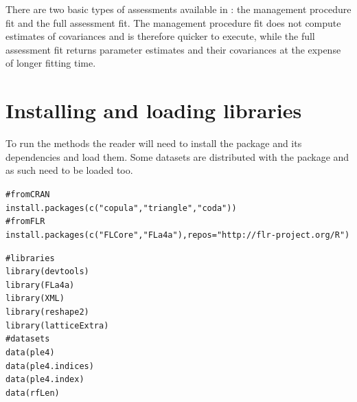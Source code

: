\documentclass[a4paper,english,10pt]{article}\usepackage[]{graphicx}\usepackage[]{color}
\makeatletter
\newcommand{\hlstr}[1]{\textcolor[rgb]{0.063,0.58,0.627}{#1}}%
\newcommand{\hlcom}[1]{\textcolor[rgb]{0.588,0.588,0.588}{#1}}%
\newcommand{\hlstd}[1]{\textcolor[rgb]{0.196,0.196,0.196}{#1}}%
\newcommand{\hlkwc}[1]{\textcolor[rgb]{0,0.631,0.314}{#1}}%
\newcommand{\hlkwd}[1]{\textcolor[rgb]{0.78,0.227,0.412}{#1}}%
\newenvironment{kframe}{%
 \def\at@end@of@kframe{}%
 \ifinner\ifhmode%
  \def\at@end@of@kframe{\end{minipage}}%
  \begin{minipage}{\columnwidth}%
 \fi\fi%
 \def\FrameCommand##1{\hskip\@totalleftmargin \hskip-\fboxsep
 \colorbox{shadecolor}{##1}\hskip-\fboxsep
     \hskip-\linewidth \hskip-\@totalleftmargin \hskip\columnwidth}%
 \MakeFramed {\advance\hsize-\width
   \@totalleftmargin\z@ \linewidth\hsize
   \@setminipage}}%
 {\par\unskip\endMakeFramed%
 \at@end@of@kframe}
\newenvironment{knitrout}{}{} %
\makeatother
\begin{document}
There are two basic types of assessments available in \aFa: the management procedure fit and the full assessment fit. The management procedure fit does not compute estimates of covariances and is therefore quicker to execute, while the full assessment fit returns parameter estimates and their covariances at the expense of longer fitting time.




\section{Installing and loading libraries}

To run the  methods the reader will need to install the package and its dependencies and load them. Some datasets are distributed with the package and as such need to be loaded too.

\begin{knitrout}
\color{fgcolor}\begin{kframe}
\begin{alltt}
\hlcom{# from CRAN}
\hlkwd{install.packages}\hlstd{(}\hlkwd{c}\hlstd{(}\hlstr{"copula"}\hlstd{,} \hlstr{"triangle"}\hlstd{,} \hlstr{"coda"}\hlstd{))}
\hlcom{# from FLR}
\hlkwd{install.packages}\hlstd{(}\hlkwd{c}\hlstd{(}\hlstr{"FLCore"}\hlstd{,} \hlstr{"FLa4a"}\hlstd{),} \hlkwc{repos} \hlstd{=} \hlstr{"http://flr-project.org/R"}\hlstd{)}
\end{alltt}
\end{kframe}
\end{knitrout}

\begin{knitrout}
\color{fgcolor}\begin{kframe}
\begin{alltt}
\hlcom{# libraries}
\hlkwd{library}\hlstd{(devtools)}
\hlkwd{library}\hlstd{(FLa4a)}
\hlkwd{library}\hlstd{(XML)}
\hlkwd{library}\hlstd{(reshape2)}
\hlkwd{library}\hlstd{(latticeExtra)}
\hlcom{# datasets}
\hlkwd{data}\hlstd{(ple4)}
\hlkwd{data}\hlstd{(ple4.indices)}
\hlkwd{data}\hlstd{(ple4.index)}
\hlkwd{data}\hlstd{(rfLen)}
\end{alltt}
\end{kframe}
\end{knitrout}
\end{document}
